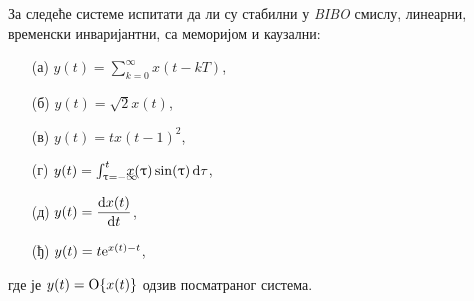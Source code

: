 \PID
За следеће системе испитати да ли су стабилни
у \textit{BIBO} смислу,
линеарни, временски инваријантни, 
са меморијом и каузални: 
\begin{multicols}{3}
\begin{enumerate}
\item[(а)] $y(t) = \sum_{k = 0}^{\infty} x(t-kT)$, 
\item[(б)] $y(t) = \sqrt{2} x(t)$,
\item[(в)] $y(t) = t x(t-1)^2$,
\item[(г)] $y(t) = \int_{\uptau = -\infty}^{t}
\hspace{-0.99em}
x(\uptau) \sin(\uptau) \,{\rm d}\tau$,
\item[(д)] $y(t) = \dfrac{{\rm d} x(t)}{{\rm d} t}
$,
\item[(ђ)] $y(t) =t {\rm e}^{x(t) - t}$,
\end{enumerate}
\end{multicols}\noindent
где је $y(t) = {\rm O}\{x(t)\}$ одзив посматраног система.
\\[2mm]

